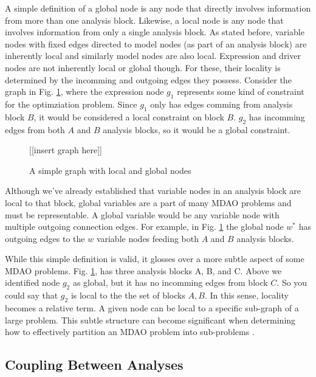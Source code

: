   A simple definition of a global node is any node that directly involves information 
  from more than one analysis block. Likewise, a local node is any node 
  that involves information from only a single analysis block. As stated before, variable 
  nodes with fixed edges directed to model nodes (as part of an analysis block) are inherently local 
  and similarly model nodes are also local. Expression and driver nodes
  are not inherently local or global though. For these, their locality is determined 
  by the incomming and outgoing edges they possess. Consider the graph in Fig. \ref{f:local_global}, 
  where the expression node $g_1$ represents some kind of constraint for the optimziation problem. 
  Since $g_1$ only has edges comming from analysis block $B$, it would be considered a local constraint 
  on block $B$. $g_2$ has incomming edges from both $A$ and $B$ analysis blocks, so it would be a global constraint. 

  \begin{figure}
      \begin{center}
      [[insert graph here]]
      \caption{A simple graph with local and global nodes \label{f:local_global}}
      \end{center}
  \end{figure}

  Although we've already established that variable nodes in an analysis block are local to that 
  block, global variables are a part of many MDAO problems and must be representable. A global variable 
  would be any variable node with multiple outgoing connection edges. 
  For example, in Fig. \ref{f:local_global} the global node $w^*$ has outgoing edges to 
  the $w$ variable nodes feeding both $A$ and $B$ analysis blocks.

  While this simple definition is valid, it glosses over a more subtle aspect of 
  some MDAO problems. Fig. \ref{f:local_global}, has three analysis 
  blocks A, B, and C. Above we identified node $g_2$ as global,  but
  it has no incomming edges from block $C$. So you could say that $g_2$ is 
  local to the the set of blocks $A,B$. In this sense, locality 
  becomes a relative term. A given node can be local to a specific sub-graph of a large
  problem. This subtle structure can become significant when determining how to 
  effectively partition an MDAO problem into sub-problems 
  \cite{krishnamachari1997optimal,allison2009optimal,michelena1997hypergraph}.

\subsection{Coupling Between Analyses}

